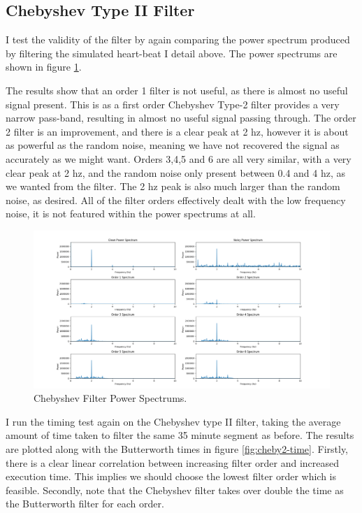 \documentclass[12pt,a4paper,twoside,openany]{report}
\begin{document}
\subsection{Chebyshev Type II Filter}

I test the validity of the filter by again comparing the power spectrum produced by
filtering the simulated heart-beat I detail above. The power spectrums are
shown in figure 
\ref{fig:cheby2-validity}. 

The results show that an order 1 filter is not useful, as there is almost no
useful signal present. This is as a first order Chebyshev Type-2 filter
provides a very narrow pass-band, resulting in almost no useful signal passing
through. The order 2 filter is an improvement, and there is a
clear peak at 2 hz, however it is about as powerful as the random noise,
meaning we have not recovered the signal as accurately as we might want. 
Orders 3,4,5 and 6 are all very
similar, with a very clear peak at 2 hz, and the random noise only present
between 0.4 and 4 hz, as we wanted from the filter. The 2 hz peak is also much
larger than the random noise, as desired. All of the filter orders effectively
dealt with the low frequency noise, it is not featured within the power
spectrums at all.


\begin{figure}
	\centering
	\includegraphics[width=\textwidth]{figs/cheby2-validity.png}
	\caption{Chebyshev Filter Power Spectrums.}
	\label{fig:cheby2-validity}
\end{figure}

I run the timing test again on the Chebyshev type II filter, taking the average amount
of time taken to filter the same 35 minute segment as before. The results are
plotted along with the Butterworth times in figure \ref{fig:cheby2-time}. 
Firstly, there is a clear linear
correlation between increasing filter order and increased execution time. This
implies we should choose the lowest filter order which is feasible. Secondly,
note that the Chebyshev filter takes over double the time as the
Butterworth filter for each order.
\end{document}
